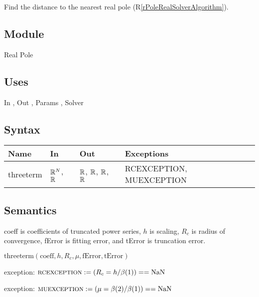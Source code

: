 \documentclass[12pt, titlepage]{article}
\newcommand{\rref}[1]{(R\ref{#1})}
\begin{document}
Find the distance to the nearest real pole \rref{rPoleRealSolverAlgorithm}.

\subsection{Module}

Real Pole

\subsection{Uses}

In , Out , Params , Solver 

\subsection{Syntax}

\begin{tabular}{p{3cm} p{5cm} p{3cm} >{\raggedright\arraybackslash}p{5cm}}
\toprule
\textbf{Name} & \textbf{In} & \textbf{Out} & \textbf{Exceptions} \\
\midrule
  threeterm & $\mathbb{R}^N$, $\mathbb{R}$ &  $\mathbb{R}$, $\mathbb{R}$, $\mathbb{R}$, $\mathbb{R}$ & {\footnotesize RCEXCEPTION, MUEXCEPTION} \\
\bottomrule
\end{tabular}

\subsection{Semantics}

coeff is coefficients of truncated power series,
$h$ is scaling,
$R_c$ is radius of convergence,
fError is fitting error, and
tError is truncation error.

\vspace{.3cm}

\Ni $\text{threeterm}( \text{coeff}, h, R_c, \mu, \text{fError}, \text{tError})$

\vspace{.3cm}

\Ni exception: $\text{\footnotesize RCEXCEPTION} := (R_c = h/\beta(1)) == \text{NaN}$

\vspace{.3cm}

\Ni exception: $\text{\footnotesize MUEXCEPTION} := (\mu = \beta(2)/\beta(1)) == \text{NaN}$

\vspace{.3cm}
\end{document}
